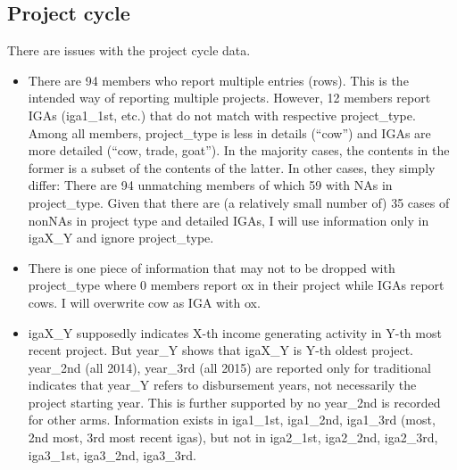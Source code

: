\subsection{Project cycle}


There are issues with the project cycle data. 
\begin{itemize}
\vspace{1.0ex}\setlength{\itemsep}{1.0ex}\setlength{\baselineskip}{12pt}
\item  There are 94 members who report multiple entries (rows). This is the intended way of reporting multiple projects. However, 12 members report IGAs (\textsf{iga1\_1st}, etc.) that do not match with respective \textsf{project\_type}. Among all members, \textsf{project\_type} is less in details (``cow'') and IGAs are more detailed (``cow, trade, goat''). In the majority cases, the contents in the former is a subset of the contents of the latter. In other cases, they simply differ: There are 94 unmatching members of which 59 with NAs in \textsf{project\_type}. Given that there are (a relatively small number of) 35 cases of nonNAs in project type and detailed IGAs, I will use information only in \textsf{igaX\_Y} and ignore \textsf{project\_type}. 
\item	There is one piece of information that may not to be dropped with \textsf{project\_type} where 0 members report ox in their project while IGAs report cows. I will overwrite cow as IGA with ox.
\item	\textsf{igaX\_Y} supposedly indicates \textsf{X}-th income generating activity in \textsf{Y}-th most recent project. But \textsf{year\_Y} shows that \textsf{igaX\_Y} is \textsf{Y}-th oldest project. \textsf{year\_2nd} (all 2014), \textsf{year\_3rd} (all 2015) are reported only for \textsf{traditional} indicates that \textsf{year\_Y} refers to disbursement years, not necessarily the project starting year. This is further supported by no \textsf{year\_2nd} is recorded for other arms. Information exists in \textsf{iga1\_1st}, \textsf{iga1\_2nd}, \textsf{iga1\_3rd} (most, 2nd most, 3rd most recent igas), but not in \textsf{iga2\_1st}, \textsf{iga2\_2nd}, \textsf{iga2\_3rd}, \textsf{iga3\_1st}, \textsf{iga3\_2nd}, \textsf{iga3\_3rd}. 
\end{itemize}
